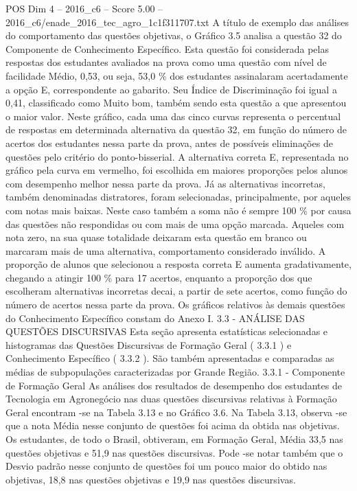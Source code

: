 \begin{textsample}{POS Dim 4 – 2016\_c6 – Score 5.00 – 2016\_c6/enade\_2016\_tec\_agro\_1c1f311707.txt}
A título de exemplo das análises do comportamento das questões objetivas, o Gráfico 3.5 analisa a questão 32 do Componente de Conhecimento Específico.
Esta questão foi considerada pelas respostas dos estudantes avaliados na prova como uma questão com nível de facilidade Médio, 0,53, ou seja, 53,0 \% dos estudantes assinalaram acertadamente a opção E, correspondente ao gabarito.
Seu Índice de Discriminação foi igual a 0,41, classificado como Muito bom, também sendo esta questão a que apresentou o maior valor.
Neste gráfico, cada uma das cinco curvas representa o percentual de respostas em determinada alternativa da questão 32, em função do número de acertos dos estudantes nessa parte da prova, antes de possíveis eliminações de questões pelo critério do ponto-bisserial.
A alternativa correta E, representada no gráfico pela curva em vermelho, foi escolhida em maiores proporções pelos alunos com desempenho melhor nessa parte da prova.
Já as alternativas incorretas, também denominadas distratores, foram selecionadas, principalmente, por aqueles com notas mais baixas.
Neste caso também a soma não é sempre 100 \% por causa das questões não respondidas ou com mais de uma opção marcada.
Aqueles com nota zero, na sua quase totalidade deixaram esta questão em branco ou marcaram mais de uma alternativa, comportamento considerado inválido.
A proporção de alunos que selecionou a resposta correta E aumenta gradativamente, chegando a atingir 100 \% para 17 acertos, enquanto a proporção dos que escolheram alternativas incorretas decai, a partir de sete acertos, como função do número de acertos nessa parte da prova.
Os gráficos relativos às demais questões do Conhecimento Específico constam do Anexo I. 3.3 - ANÁLISE DAS QUESTÕES DISCURSIVAS Esta seção apresenta estatísticas selecionadas e histogramas das Questões Discursivas de Formação Geral ( 3.3.1 ) e Conhecimento Específico ( 3.3.2 ).
São também apresentadas e comparadas as médias de subpopulações caracterizadas por Grande Região. 3.3.1 - Componente de Formação Geral As análises dos resultados de desempenho dos estudantes de Tecnologia em Agronegócio nas duas questões discursivas relativas à Formação Geral encontram -se na Tabela 3.13 e no Gráfico 3.6.
Na Tabela 3.13, observa -se que a nota Média nesse conjunto de questões foi acima da obtida nas objetivas.
Os estudantes, de todo o Brasil, obtiveram, em Formação Geral, Média 33,5 nas questões objetivas e 51,9 nas questões discursivas.
Pode -se notar também que o Desvio padrão nesse conjunto de questões foi um pouco maior do obtido nas objetivas, 18,8 nas questões objetivas e 19,9 nas questões discursivas.

\end{textsample}

